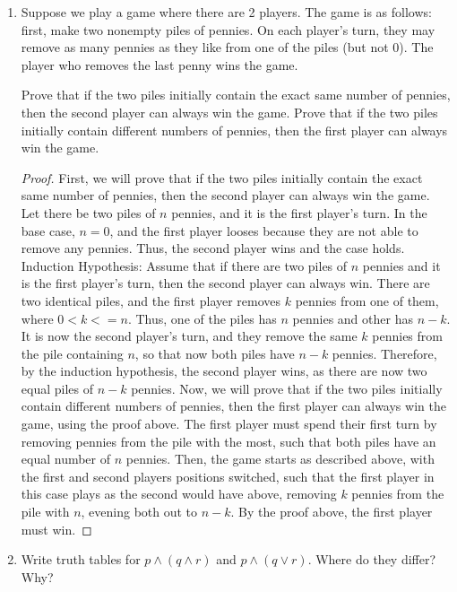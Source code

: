 \documentclass[12pt]{article}
\begin{document}
\begin{enumerate}
\item Suppose we play a game where there are 2 players. The game is as follows: first, make two nonempty piles of pennies. On each player's turn, they may remove as many pennies as they like from one of the piles (but not 0). The player who removes the last penny wins the game.

Prove that if the two piles initially contain the exact same number of pennies, then the second player can always win the game. Prove that if the two piles initially contain different numbers of pennies, then the first player can always win the game.

\begin{proof}
First, we will prove that if the two piles initially contain the exact same number of pennies, then the second player can always win the game. Let there be two piles of $n$ pennies, and it is the first player's turn. In the base case, $n=0$, and the first player looses because they are not able to remove any pennies. Thus, the second player wins and the case holds. 
\hfill\break\break
Induction Hypothesis: Assume that if there are two piles of $n$ pennies and it is the first player's turn, then the second player can always win.
\hfill\break\break
There are two identical piles, and the first player removes $k$ pennies from one of them, where $0 < k <= n$. Thus, one of the piles has $n$ pennies and other has $n-k$. It is now the second player's turn, and they remove the same $k$ pennies from the pile containing $n$, so that now both piles have $n-k$ pennies. Therefore, by the induction hypothesis, the second player wins, as there are now two equal piles of $n-k$ pennies.
\hfill\break\break
Now, we will prove that if the two piles initially contain different numbers of pennies, then the first player can always win the game, using the proof above. The first player must spend their first turn by removing pennies from the pile with the most, such that both piles have an equal number of $n$ pennies. Then, the game starts as described above, with the first and second players positions switched, such that the first player in this case plays as the second would have above, removing $k$ pennies from the pile with $n$, evening both out to $n-k$. By the proof above, the first player must win. 

\end{proof}

\item Write truth tables for $p\wedge(q\wedge r)$ and $p\wedge(q\vee r)$. Where do they differ? Why?


\end{enumerate}
\end{document}
